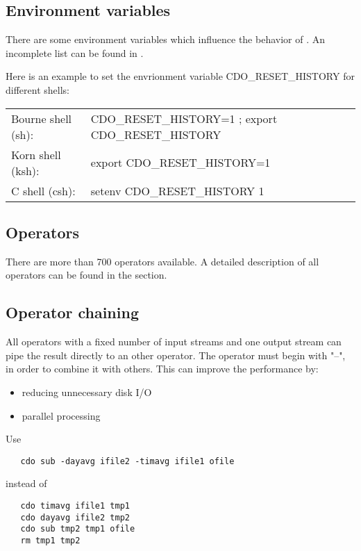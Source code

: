 \subsection{Environment variables}

There are some environment variables which influence the behavior of {\CDO}. 
An incomplete list can be found in .

Here is an example to set the envrionment variable CDO\_RESET\_HISTORY for different shells:

\begin{tabular}[b]{ll}
Bourne shell (sh): & CDO\_RESET\_HISTORY=1 ; export CDO\_RESET\_HISTORY \\
Korn shell (ksh):   & export CDO\_RESET\_HISTORY=1 \\
C shell (csh):        & setenv CDO\_RESET\_HISTORY 1 \\
\end{tabular}


\subsection{Operators}

There are more than 700 operators available.
A detailed description of all operators can be found in the
{\bf {}} section.


\subsection{Operator chaining}

All operators with a fixed number of input streams and one output stream
can pipe the result directly to an other operator.
The operator must begin with "--", in order to combine it with others.
This can improve the performance by:
\begin{itemize}
\item reducing unnecessary disk I/O
\item parallel processing
\end{itemize}
Use
\begin{verbatim}
   cdo sub -dayavg ifile2 -timavg ifile1 ofile
\end{verbatim}
instead of
\begin{verbatim}
   cdo timavg ifile1 tmp1
   cdo dayavg ifile2 tmp2
   cdo sub tmp2 tmp1 ofile
   rm tmp1 tmp2
\end{verbatim}

